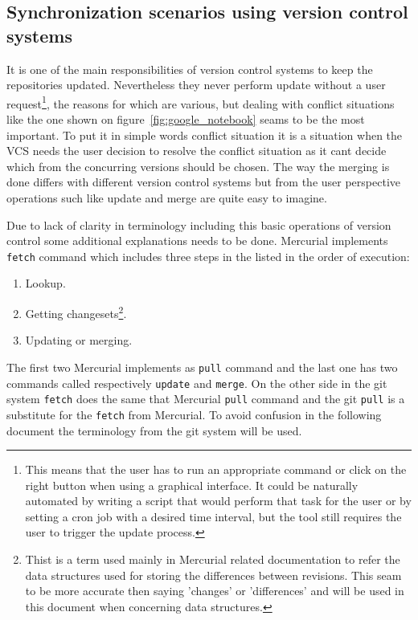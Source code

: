 \subsection{Synchronization scenarios using version control systems}\label{subsec:sync_scenarios}
It is one of the main responsibilities of version control systems to keep the repositories updated. Nevertheless they never perform update without a user request\footnote{This means that the user has to run an appropriate command or click on the right button when using a graphical interface. It could be naturally automated by writing a script that would perform that task for the user or by setting a cron job with a desired time interval, but the tool still requires the user to trigger the update process.}, the reasons for which are various, but dealing with conflict situations like the one shown on figure~\ref{fig:google_notebook} seams to be the most important. To put it in simple words conflict situation it is a situation when the VCS needs the user decision to resolve the conflict situation as it cant decide which from the concurring versions should be chosen. The way the merging is done differs with different version control systems but from the user perspective operations such like update and merge are quite easy to imagine. 

Due to lack of clarity in terminology including this basic operations of version control some additional explanations needs to be done. Mercurial implements \texttt{fetch} command  which includes three steps in the listed in  the order of execution:
\begin{enumerate}
\item{Lookup.}
\item{Getting changesets\footnote{Thist is a term used mainly in Mercurial related documentation to refer the data structures used for storing the differences between revisions. This seam to be more accurate then saying 'changes' or 'differences' and will be used in this document when concerning data structures.}.}
\item{Updating or merging.}
\end{enumerate}
The first two Mercurial implements as \texttt{pull} command and the last one has two commands called respectively \texttt{update} and \texttt{merge}. On the other side in the git system \texttt{fetch} does the same that Mercurial \texttt{pull} command and the git \texttt{pull} is a substitute for the \texttt{fetch} from Mercurial. To avoid confusion in the following document the terminology from the git system will be used.


